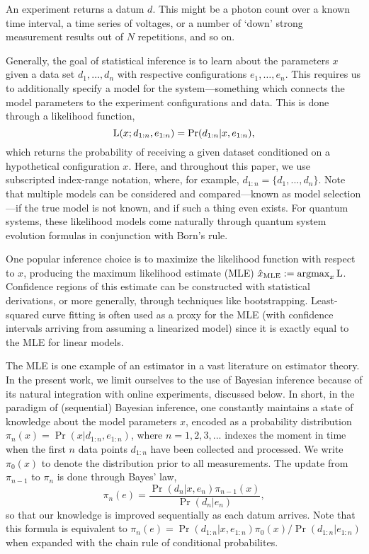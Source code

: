 \documentclass[aps,nofootinbib,twocolumn,superscriptaddress]{revtex4}
\newcommand{\mps}{x}
\newcommand{\eps}{e}
\newcommand{\data}{d}
\newcommand{\MLE}{\text{MLE}}
\begin{document}
An experiment returns a datum $\data$. 
This might be a photon count
over a known time interval, a time series of voltages, 
or a number of `down' strong measurement results out of $N$ 
repetitions, and so on.

Generally, the goal of statistical inference is to learn about the parameters
$\mps$ given a data set $\data_1,\ldots,\data_n$ with respective 
configurations $\eps_1,\ldots,\eps_n$.
This requires us to additionally specify a model for the 
system---something which connects the model parameters to the experiment 
configurations and data.
This is done through a likelihood function,
\begin{equation}
    \Lhood(\mps;\data_{1:n},\eps_{1:n})
        = \Pr(\data_{1:n}|\mps,\eps_{1:n}),
    \label{eq:general-likelihood-function}
\end{equation} 
which returns the probability of receiving a given dataset conditioned
on a hypothetical configuration $\mps$.
Here, and throughout this paper, we use subscripted index-range notation,
where, for example, $\data_{1:n}=\{\data_1,...,\data_n\}$.
Note that multiple models can be considered and compared---known
as model selection---if the
true model is not known, and if such a thing even exists.
For quantum systems, these likelihood models come naturally
through quantum system evolution formulas in conjunction 
with Born's rule.

One popular inference choice is to maximize the likelihood function
with respect to $\mps$, producing the maximum likelihood estimate (MLE) 
$\hat{\mps}_\MLE:=\operatorname{argmax}_\mps \Lhood$.
Confidence regions of this estimate can be constructed 
with statistical derivations, or more generally, through techniques like bootstrapping.
Least-squared curve fitting is often used as a proxy for the MLE (with 
confidence intervals arriving from assuming
a linearized model) since it is exactly equal to the MLE
for linear models.

The MLE is one example of an estimator in a vast literature on estimator theory.
In the present work, we limit ourselves to the use of Bayesian inference because of its
natural integration with online experiments, discussed below.
In short, in the paradigm of (sequential) Bayesian inference, one constantly
maintains a state of knowledge about the model parameters $\mps$, encoded
as a probability distribution $\pi_n(\mps)=\Pr(\mps|\data_{1:n},\eps_{1:n})$, 
where $n=1,2,3,...$ indexes the moment in time when the first $n$ data 
points $\data_{1:n}$ have been collected and processed.
We write $\pi_0(x)$ to denote the distribution prior to all measurements.
The update from $\pi_{n-1}$ to $\pi_n$ is done through Bayes' law,
\begin{equation}
    \pi_n(\eps)
        = \frac{
            \Pr(\data_n|\mps,\eps_n)\pi_{n-1}(\mps)
        }{
            \Pr(\data_n|\eps_n)
        },
\end{equation}
so that our knowledge is improved sequentially as each datum arrives.
Note that this formula is equivalent to 
$\pi_n(\eps)=\Pr(\data_{1:n}|\mps,\eps_{1:n})\pi_0(\mps)/\Pr(\data_{1:n}|\eps_{1:n})$ when expanded with the chain rule of conditional probabilites.
\end{document}
